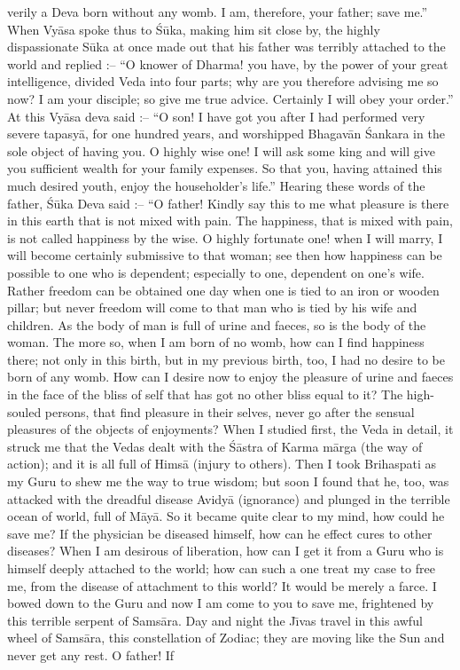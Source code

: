verily a Deva born without any womb. I am, therefore, your father; save me.'' When Vy\=asa spoke thus to \'S\=uka, making him sit close by, the highly dispassionate S\=uka at once made out that his father was terribly attached to the world and replied :-- ``O knower of Dharma! you have, by the power of your great intelligence, divided Veda into four parts; why are you therefore advising me so now? I am your disciple; so give me true advice. Certainly I will obey your order.'' At this Vy\=asa deva said :-- ``O son! I have got you after I had performed very severe tapasy\=a, for one hundred years, and worshipped Bhagav\=an \'Sankara in the sole object of having you. O highly wise one! I will ask some king and will give you sufficient wealth for your family expenses. So that you, having attained this much desired youth, enjoy the householder's life.'' Hearing these words of the father, \'S\=uka Deva said :-- ``O father! Kindly say this to me what pleasure is there in this earth that is not mixed with pain. The happiness, that is mixed with pain, is not called happiness by the wise. O highly fortunate one! when I will marry, I will become certainly submissive to that woman; see then how happiness can be possible to one who is dependent; especially to one, dependent on one's wife. Rather freedom can be obtained one day when one is tied to an iron or wooden pillar; but never freedom will come to that man who is tied by his wife and children. As the body of man is full of urine and faeces, so is the body of the woman. The more so, when I am born of no womb, how can I find happiness there; not only in this birth, but in my previous birth, too, I had no desire to be born of any womb. How can I desire now to enjoy the pleasure of urine and faeces in the face of the bliss of self that has got no other bliss equal to it? The high-souled persons, that find pleasure in their selves, never go after the sensual pleasures of the objects of enjoyments? When I studied first, the Veda in detail, it struck me that the Vedas dealt with the \'S\=astra of Karma m\=arga (the way of action); and it is all full of Hims\=a (injury to others). Then I took Brihaspati as my Guru to shew me the way to true wisdom; but soon I found that he, too, was attacked with the dreadful disease Avidy\=a (ignorance) and plunged in the terrible ocean of world, full of M\=ay\=a. So it became quite clear to my mind, how could he save me? If the physician be diseased himself, how can he effect cures to other diseases? When I am desirous of liberation, how can I get it from a Guru who is himself deeply attached to the world; how can such a one treat my case to free me, from the disease of attachment to this world? It would be merely a farce. I bowed down to the Guru and now I am come to you to save me, frightened by this terrible serpent of Sams\=ara. Day and night the J\={\i}vas travel in this awful wheel of Sams\=ara, this constellation of Zodiac; they are moving like the Sun and never get any rest. O father! If

